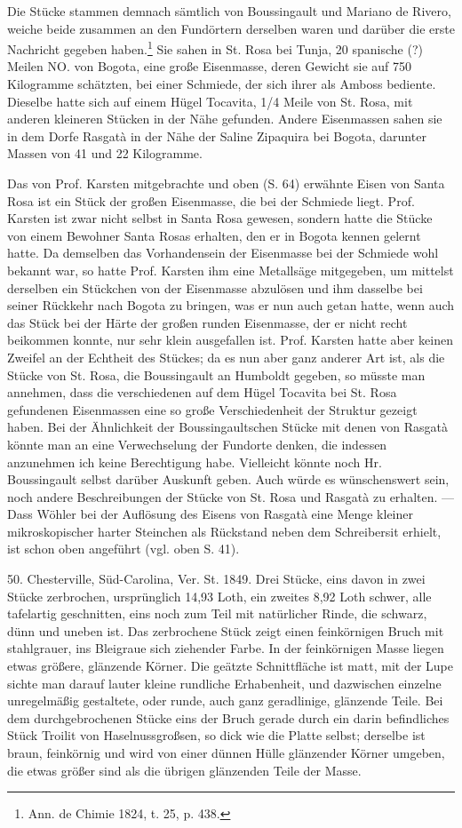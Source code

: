 \documentclass[a4paper, 11pt, oneside]{article}
\begin{document}
Die Stücke stammen demnach sämtlich von Boussingault und Mariano de Rivero, weiche beide zusammen an den Fundörtern derselben waren und darüber die erste Nachricht gegeben haben.\footnote{Ann. de Chimie 1824, t. 25, p. 438.} Sie sahen in St. Rosa bei Tunja, 20 spanische (?) Meilen NO. von Bogota, eine große Eisenmasse, deren Gewicht sie auf 750 Kilogramme schätzten, bei einer Schmiede, der sich ihrer als Amboss bediente. Dieselbe hatte sich auf einem Hügel Tocavita, 1/4 Meile von St. Rosa, mit anderen kleineren Stücken in der Nähe gefunden. Andere Eisenmassen sahen sie in dem Dorfe Rasgatà in der Nähe der Saline Zipaquira bei Bogota, darunter Massen von 41 und 22 Kilogramme.

Das von Prof. Karsten mitgebrachte und oben (S. 64) erwähnte Eisen von Santa Rosa ist ein Stück der großen Eisenmasse, die bei der Schmiede liegt. Prof. Karsten ist zwar nicht selbst in Santa Rosa gewesen, sondern hatte die Stücke von einem Bewohner Santa Rosas erhalten, den er in Bogota kennen gelernt hatte. Da demselben das Vorhandensein der Eisenmasse bei der Schmiede wohl bekannt war, so hatte Prof. Karsten ihm eine Metallsäge mitgegeben, um mittelst derselben ein Stückchen von der Eisenmasse abzulösen und ihm dasselbe bei seiner Rückkehr nach Bogota zu bringen, was er nun auch getan hatte, wenn auch das Stück bei der Härte der großen runden Eisenmasse, der er nicht recht beikommen konnte, nur sehr klein ausgefallen ist. Prof. Karsten hatte aber keinen Zweifel an der Echtheit des Stückes; da es nun aber ganz anderer Art ist, als die Stücke von St. Rosa, die Boussingault an Humboldt gegeben, so müsste man annehmen, dass die verschiedenen auf dem Hügel Tocavita bei St. Rosa gefundenen Eisenmassen eine so große Verschiedenheit der Struktur gezeigt haben. Bei der Ähnlichkeit der Boussingaultschen Stücke mit denen von Rasgatà könnte man an eine Verwechselung der Fundorte denken, die indessen anzunehmen ich keine Berechtigung habe. Vielleicht könnte noch Hr. Boussingault selbst darüber Auskunft geben. Auch würde es wünschenswert sein, noch andere Beschreibungen der Stücke von St. Rosa und Rasgatà zu erhalten. — Dass Wöhler bei der Auflösung des Eisens von Rasgatà eine Menge kleiner mikroskopischer harter Steinchen als Rückstand neben dem Schreibersit erhielt, ist schon oben angeführt (vgl. oben S. 41).

50. Chesterville, Süd-Carolina, Ver. St. 1849. Drei Stücke, eins davon in zwei Stücke zerbrochen, ursprünglich 14,93 Loth, ein zweites 8,92 Loth schwer, alle tafelartig geschnitten, eins noch zum Teil mit natürlicher Rinde, die schwarz, dünn und uneben ist. Das zerbrochene Stück zeigt einen feinkörnigen Bruch mit stahlgrauer, ins Bleigraue sich ziehender Farbe. In der feinkörnigen Masse liegen etwas größere, glänzende Körner. Die geätzte Schnittfläche ist matt, mit der Lupe sichte man darauf lauter kleine rundliche Erhabenheit, und dazwischen einzelne unregelmäßig gestaltete, oder runde, auch ganz geradlinige, glänzende Teile. Bei dem durchgebrochenen Stücke eins der Bruch gerade durch ein darin befindliches Stück Troilit von Haselnussgroßsen, so dick wie die Platte selbst; derselbe ist braun, feinkörnig und wird von einer dünnen Hülle glänzender Körner umgeben, die etwas größer sind als die übrigen glänzenden Teile der Masse.
\end{document}
